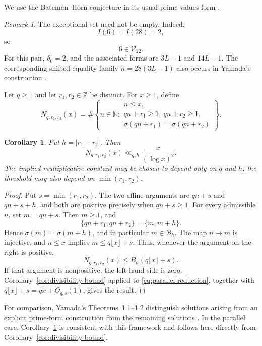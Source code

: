 \documentclass[11pt,reqno]{amsart}
\numberwithin{equation}{section}
\theoremstyle{plain}
\newtheorem{corollary}[theorem]{Corollary}
\theoremstyle{definition}
\theoremstyle{remark}
\newtheorem{remark}[theorem]{Remark}
\newcommand{\N}{\mathbb N}
\newcommand{\Z}{\mathbb Z}
\begin{document}
We use the Bateman--Horn conjecture in its usual prime-values form
\cite{BatemanHorn1962}.

\begin{remark}\label{rem:V22}
The exceptional set need not be empty. Indeed,
\[
I(6)=I(28)=2,
\]
so
\[
6\in\mathcal V_{22}.
\]
For this pair, $\delta_6=2$, and the associated forms are $3L-1$ and $14L-1$. The corresponding shifted-equality family $n=28(3L-1)$ also occurs in Yamada's construction
\cite{Yamada2017}.
\end{remark}

Let $q\ge1$ and let $r_1,r_2\in\Z$ be distinct. For $x\ge1$, define
\[
N_{q,r_1,r_2}(x)
=
\#\left\{
 n\in\N:
 \begin{array}{l}
 n\le x,\\
 qn+r_1\ge1,\ qn+r_2\ge1,\\
 \sigma(qn+r_1)=\sigma(qn+r_2)
 \end{array}
\right\}.
\]

\begin{corollary}\label{cor:parallel}
Put $h=|r_1-r_2|$. Then
\[
N_{q,r_1,r_2}(x)\ll_{q,h}\frac{x}{(\log x)^2}.
\]
The implied multiplicative constant may be chosen to depend only on $q$ and $h$; the threshold may also depend on $\min(r_1,r_2)$.
\end{corollary}
\begin{proof}
Put $s=\min(r_1,r_2)$. The two affine arguments are $qn+s$ and $qn+s+h$, and both are positive precisely when $qn+s\ge1$. For every admissible $n$, set $m=qn+s$. Then $m\ge1$, and
\[
\{qn+r_1,qn+r_2\}=\{m,m+h\}.
\]
Hence $\sigma(m)=\sigma(m+h)$, and in particular $m\in\mathcal B_h$. The map $n\mapsto m$ is injective, and $n\le x$ implies $m\le q\lfloor x\rfloor+s$. Thus, whenever the argument on the right is positive,
\begin{equation}\label{eq:parallel-reduction}
N_{q,r_1,r_2}(x)\le B_h(q\lfloor x\rfloor+s).
\end{equation}
If that argument is nonpositive, the left-hand side is zero. Corollary~\ref{cor:divisibility-bound} applied to \eqref{eq:parallel-reduction}, together with $q\lfloor x\rfloor+s=qx+O_{q,s}(1)$, gives the result.
\end{proof}

For comparison, Yamada's Theorems~1.1--1.2 distinguish solutions arising
from an explicit prime-form construction from the remaining solutions
\cite{Yamada2017}. In the parallel case, Corollary~\ref{cor:parallel}
is consistent with this framework and follows here directly from
Corollary~\ref{cor:divisibility-bound}.
\end{document}
